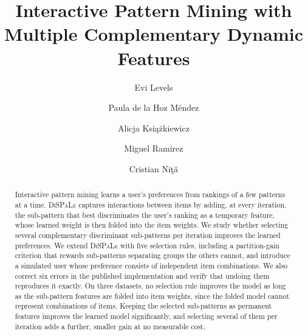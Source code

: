 \documentclass[sigconf]{acmart}
\begin{document}
\title{Interactive Pattern Mining with Multiple Complementary Dynamic Features}

\author{Evi Levels}
\author{Paula de la Hoz M\'endez}
\author{Alicja Ksi\k{a}żkiewicz }
\author{Miguel Ramirez}
\author{Cristian Ni\c{t}\u{a}}

\begin{abstract}
Interactive pattern mining learns a user's preferences from rankings of a few patterns at a time.
\textsc{DiSPaLe} captures interactions between items by adding, at every iteration, the sub-pattern that best
discriminates the user's ranking as a temporary feature, whose learned weight is then folded into the item
weights. We study whether selecting several complementary discriminant sub-patterns per iteration improves
the learned preferences. We extend \textsc{DiSPaLe} with five selection rules, including a partition-gain
criterion that rewards sub-patterns separating groups the others cannot, and introduce a simulated user whose
preference consists of independent item combinations. We also correct six errors in the published
implementation and verify that undoing them reproduces it exactly. On three datasets, no selection rule
improves the model as long as the sub-pattern features are folded into item weights, since the folded model
cannot represent combinations of items. Keeping the selected sub-patterns as permanent features improves the
learned model significantly, and selecting several of them per iteration adds a further, smaller gain at no
measurable cost.
\end{abstract}

\maketitle
\end{document}
